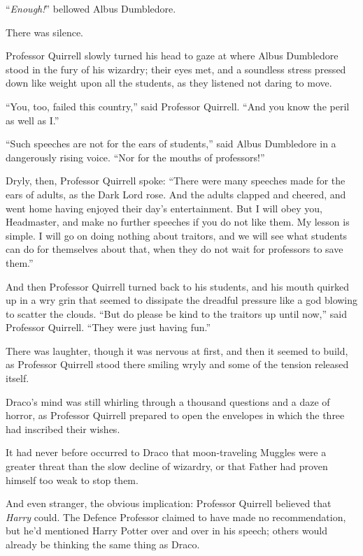“\emph{Enough!}” bellowed Albus Dumbledore.

There was silence.

Professor Quirrell slowly turned his head to gaze at where Albus Dumbledore
stood in the fury of his wizardry; their eyes met, and a soundless stress
pressed down like weight upon all the students, as they listened not daring to
move.

“You, too, failed this country,” said Professor Quirrell. “And you know the
peril as well as I.”

“Such speeches are not for the ears of students,” said Albus Dumbledore in a
dangerously rising voice. “Nor for the mouths of professors!”

Dryly, then, Professor Quirrell spoke: “There were many speeches made for the
ears of adults, as the Dark Lord rose. And the adults clapped and cheered, and
went home having enjoyed their day’s entertainment. But I will obey you,
Headmaster, and make no further speeches if you do not like them. My lesson is
simple. I will go on doing nothing about traitors, and we will see what
students can do for themselves about that, when they do not wait for professors
to save them.”

And then Professor Quirrell turned back to his students, and his mouth quirked
up in a wry grin that seemed to dissipate the dreadful pressure like a god
blowing to scatter the clouds. “But do please be kind to the traitors up until
now,” said Professor Quirrell. “They were just having fun.”

There was laughter, though it was nervous at first, and then it seemed to
build, as Professor Quirrell stood there smiling wryly and some of the tension
released itself.

\later

Draco’s mind was still whirling through a thousand questions and a daze of
horror, as Professor Quirrell prepared to open the envelopes in which the three
had inscribed their wishes.

It had never before occurred to Draco that moon-traveling Muggles were a
greater threat than the slow decline of wizardry, or that Father had proven
himself too weak to stop them.

And even stranger, the obvious implication: Professor Quirrell believed that
\emph{Harry} could. The Defence Professor claimed to have made no
recommendation, but he’d mentioned Harry Potter over and over in his speech;
others would already be thinking the same thing as Draco.

